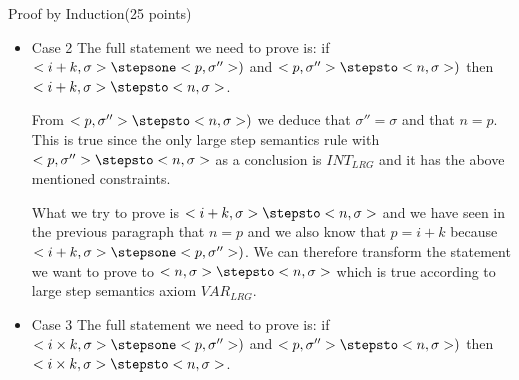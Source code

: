 \documentclass{article}
\begin{document}
\begin{question}{Proof by Induction}{(25 points)}
\begin{subquestion}
\begin{itemize}
From $<n, \sigma''> \stepsto <n, \sigma>)$ we deduce that $\sigma'' = \sigma$. This is true since the only large step semantics rule with $<n, \sigma''> \stepsto <n, \sigma>$ as a conclusion is $INT_{LRG}$.

Since $\sigma'' = \sigma$, we can transform the hypothesis $<x, \sigma> \stepsone <n, \sigma''>$ to $<x, \sigma> \stepsone <n, \sigma>$. The only inference rule in the small step semantics with this conclusion is VAR. This implies that $\sigma' = \sigma$ and that $n = \sigma(x)$. 

The conclusion that we try to prove which is $<x, \sigma> \stepsto <n, \sigma>$, can only be inferred by the large step semantics rule  $VAR_{LRG}$ and it requires that $\sigma = \sigma'$ which is the case as we have seen in the previous two paragraphs, and it requires that $\sigma(x) = n$ which is true as shown in the previous paragraph.




\item Case 2 The full statement we need to prove is: if $<i+k, \sigma> \stepsone <p, \sigma''>)$ and $<p, \sigma''> \stepsto <n, \sigma>)$ then $<i+k, \sigma> \stepsto <n, \sigma>$.

From $<p, \sigma''> \stepsto <n, \sigma>)$ we deduce that $\sigma'' = \sigma$ and that $n = p$. This is true since the only large step semantics rule with $<p, \sigma''> \stepsto <n, \sigma>$ as a conclusion is $INT_{LRG}$ and it has the above mentioned constraints.

What we try to prove is $<i+k, \sigma> \stepsto <n, \sigma>$ and we have seen in the previous paragraph that $n = p$ and we also know that $p = i + k$ because $<i+k, \sigma> \stepsone <p, \sigma''>)$. We can therefore transform the statement we want to prove to $<n, \sigma> \stepsto <n, \sigma>$ which is true according to large step semantics axiom $VAR_{LRG}$.

\item Case 3 The full statement we need to prove is: if $<i \times k, \sigma> \stepsone <p, \sigma''>)$ and $<p, \sigma''> \stepsto <n, \sigma>)$ then $<i \times k, \sigma> \stepsto <n, \sigma>$.


\end{itemize}
\end{subquestion}
\end{question}
\end{document}
